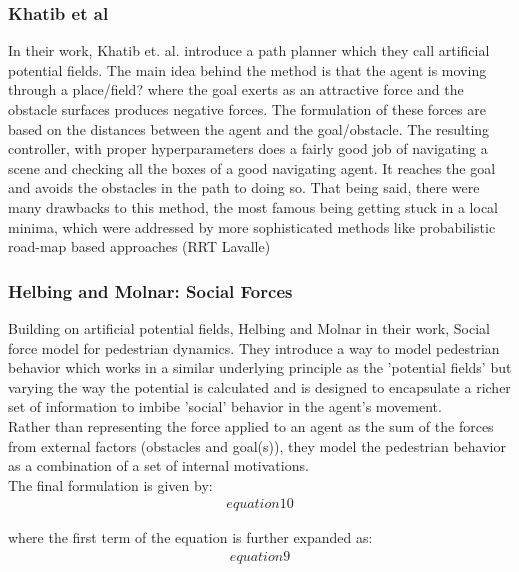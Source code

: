 \subsubsection*{Khatib et al}
In their work, Khatib et. al. introduce a path planner which they call artificial potential fields. The main idea behind the method is that the agent is moving through a place/field? where the goal exerts as an attractive force and the obstacle surfaces produces negative forces. The formulation of these forces are based on the distances between the agent and the goal/obstacle. The resulting controller, with proper hyperparameters does a fairly good job of navigating a scene and checking all the boxes of a good navigating agent. It reaches the goal and avoids the obstacles in the path to doing so. That being said, there were many drawbacks to this method, the most famous being getting stuck in a local minima, which were addressed by more sophisticated methods like probabilistic road-map based approaches (RRT Lavalle)
\subsubsection*{Helbing and Molnar: Social Forces}

Building on artificial potential fields, Helbing and Molnar in their work, Social force model for pedestrian dynamics. They introduce a way to model pedestrian behavior which works in a similar underlying principle as the 'potential fields' but varying the way the potential is calculated and is designed to encapsulate a richer set of information to imbibe 'social' behavior in the agent's movement.\\

Rather than representing the force applied to an agent as the sum of the forces from external factors (obstacles and goal(s)), they model the pedestrian behavior as a combination of a set of internal motivations.\\

The final formulation is given by:
\begin{align}
	equation 10
\end{align}

where the first term of the equation is further expanded as:\\

\begin{align}
	equation 9
\end{align}

